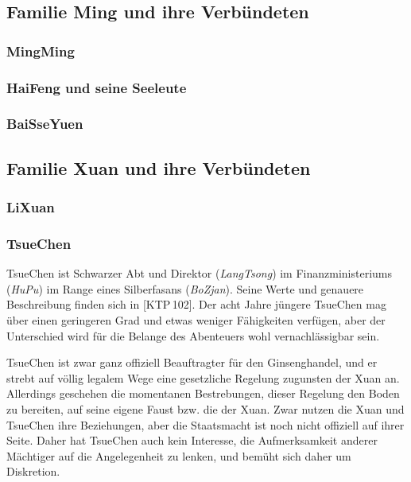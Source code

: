\documentclass[
a4paper,
twoside,
DIV=calc,
BCOR=4mm,
fontsize=9pt,
twocolumn=on,
titlepage=on,
parskip=half
]{scrartcl}
\begin{document}
\subsection{Familie Ming und ihre Verbündeten}

\subsubsection{MingMing}

\subsubsection{HaiFeng und seine Seeleute}

\subsubsection{BaiSseYuen}


\subsection{Familie Xuan und ihre Verbündeten}

\subsubsection{LiXuan}

\subsubsection{TsueChen}

TsueChen ist Schwarzer Abt und Direktor (\emph{LangTsong}) im
Finanzministeriums (\emph{HuPu}) im Range eines Silberfasans
(\emph{BoZjan}). Seine Werte und genauere Beschreibung finden sich in
[KTP\,102]. Der acht Jahre jüngere TsueChen mag über einen geringeren
Grad und etwas weniger Fähigkeiten verfügen, aber der Unterschied wird
für die Belange des Abenteuers wohl vernachlässigbar sein.

TsueChen ist zwar ganz offiziell Beauftragter für den Ginsenghandel,
und er strebt auf völlig legalem Wege eine gesetzliche Regelung
zugunsten der Xuan an. Allerdings geschehen die momentanen Bestrebungen, dieser
Regelung den Boden zu bereiten, auf seine eigene Faust bzw. die der
Xuan. Zwar nutzen die Xuan und TsueChen ihre Beziehungen, aber die
Staatsmacht ist noch nicht offiziell auf ihrer Seite. Daher hat
TsueChen auch kein Interesse, die Aufmerksamkeit anderer Mächtiger auf die
Angelegenheit zu lenken, und bemüht sich daher um Diskretion.
\end{document}
